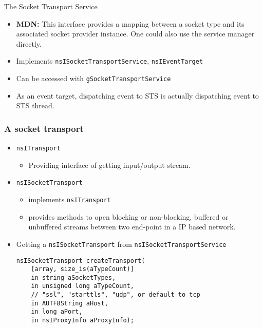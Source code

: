 \documentclass{beamer}
\begin{document}

\begin{frame}{The Socket Transport Service}
  \begin{itemize}
  \item \textbf{MDN:} This interface provides a mapping between a socket type and its associated socket provider instance. One could also use the service manager directly. 
  \item Implements \texttt{nsISocketTransportService}, \texttt{nsIEventTarget}
  \item Can be accessed with \texttt{gSocketTransportService}
  \item As an event target, dispatching event to STS is actually dispatching event to STS thread.
  \end{itemize}
\end{frame}

\begin{frame}[fragile]
  \frametitle{A socket transport}
  \begin{itemize}
  \item \texttt{nsITransport}
    \begin{itemize}
    \item Providing interface of getting input/output stream.
    \end{itemize}
  \item \texttt{nsISocketTransport}
    \begin{itemize}
    \item implements \texttt{nsITransport}
    \item provides methods to open blocking or non-blocking, buffered or unbuffered streams between two end-point in a IP based network.
    \end{itemize}
  \item Getting a \texttt{nsISocketTransport} from \texttt{nsISocketTransportService}
    \begingroup
    \fontsize{8pt}{12pt}\selectfont
\begin{verbatim}
nsISocketTransport createTransport(
    [array, size_is(aTypeCount)]
    in string aSocketTypes,
    in unsigned long aTypeCount,
    // "ssl", "starttls", "udp", or default to tcp
    in AUTF8String aHost,
    in long aPort,
    in nsIProxyInfo aProxyInfo);
\end{verbatim}
\endgroup
  \end{itemize}
\end{frame}
\end{document}

